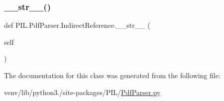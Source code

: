 \mbox{\label{classPIL_1_1PdfParser_1_1IndirectReference_a38cc4820ecb5a1e77b11b7a94c44ece8}} 
\subsubsection{\texorpdfstring{\+\_\+\+\_\+str\+\_\+\+\_\+()}{\_\_str\_\_()}}
{\footnotesize\ttfamily def P\+I\+L.\+Pdf\+Parser.\+Indirect\+Reference.\+\_\+\+\_\+str\+\_\+\+\_\+ (\begin{DoxyParamCaption}\item[{}]{self }\end{DoxyParamCaption})}



The documentation for this class was generated from the following file\+:\begin{DoxyCompactItemize}
\item 
venv/lib/python3./site-\/packages/\+P\+I\+L/\hyperlink{PdfParser_8py}{Pdf\+Parser.\+py}\end{DoxyCompactItemize}
